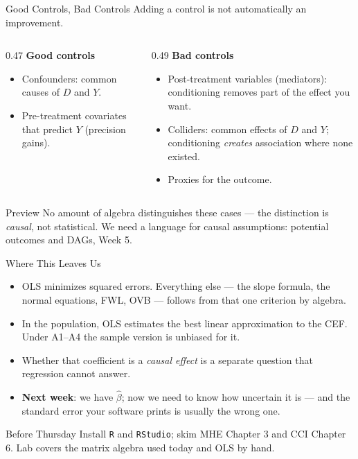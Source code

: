 \documentclass[aspectratio=169,11pt,xcolor=dvipsnames]{beamer}
\begin{document}
\begin{frame}[shrink=10]{Good Controls, Bad Controls}
Adding a control is not automatically an improvement.
\vskip4pt
\begin{columns}[T]
\begin{column}{0.47\textwidth}
\textbf{Good controls}
\begin{itemize}
  \item Confounders: common causes of $D$ and $Y$.
  \item Pre-treatment covariates that predict $Y$ (precision gains).
\end{itemize}
\end{column}
\begin{column}{0.49\textwidth}
\textbf{Bad controls}
\begin{itemize}
  \item \alert{Post-treatment} variables (mediators): conditioning removes part of
        the effect you want.
  \item \alert{Colliders}: common effects of $D$ and $Y$; conditioning
        \emph{creates} association where none existed.
  \item Proxies for the outcome.
\end{itemize}
\end{column}
\end{columns}
\vskip6pt
\begin{alertblock}{Preview}
No amount of algebra distinguishes these cases --- the distinction is
\emph{causal}, not statistical. We need a language for causal assumptions:
potential outcomes and DAGs, Week 5.
\end{alertblock}
\end{frame}

\begin{frame}{Where This Leaves Us}
\begin{itemize}\itemsep5pt
  \item OLS minimizes squared errors. Everything else --- the slope formula, the
        normal equations, FWL, OVB --- follows from that one criterion by algebra.
  \item In the population, OLS estimates the best linear approximation to the CEF.
        Under A1--A4 the sample version is unbiased for it.
  \item Whether that coefficient is a \emph{causal effect} is a separate question
        that regression cannot answer.
  \item \textbf{Next week}: we have $\hat\beta$; now we need to know how uncertain
        it is --- and the standard error your software prints is usually the wrong
        one.
\end{itemize}
\vskip6pt
\begin{block}{Before Thursday}
Install \texttt{R} and \texttt{RStudio}; skim MHE Chapter 3 and CCI Chapter 6.
Lab covers the matrix algebra used today and OLS by hand.
\end{block}
\end{frame}
\end{document}
